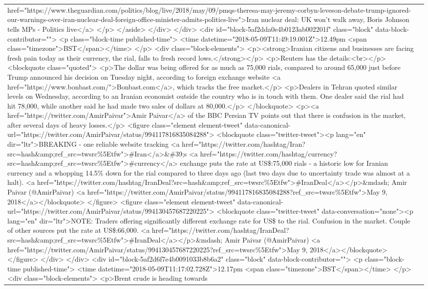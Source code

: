 \documentclass[]{article}
\begin{document}
\begin{table}[!h]
{\begin{tabular}[t]{ll}
href="https://www.theguardian.com/politics/blog/live/2018/may/09/pmqs-theresa-may-jeremy-corbyn-leveson-debate-trump-ignored-our-warnings-over-iran-nuclear-deal-foreign-office-minister-admits-politics-live">Iran nuclear deal: UK won't walk away, Boris Johnson tells MPs - Politics live</a> </p> </aside> </div>   </div> <div id="block-5af2dda0e4b0123ab002201f" class="block" data-block-contributor=""> <p class="block-time published-time"> <time datetime="2018-05-09T11:49:19.001Z">12.49pm <span class="timezone">BST</span></time> </p>    <div class="block-elements">  <p><strong>Iranian citizens and businesses are facing fresh pain today as their currency, the rial, falls to fresh record lows.</strong></p> <p>Reuters has the details:<br></p> <blockquote class="quoted"> <p>The dollar was being offered for as much as 75,000 rials, compared to around 65,000 just before Trump announced his decision on Tuesday night, according to foreign exchange website <a href="https://www.bonbast.com/">Bonbast.com</a>, which tracks the free market.</p> <p>Dealers in Tehran quoted similar levels on Wednesday, according to an Iranian economist outside the country who is in touch with them. One dealer said the rial had hit 78,000, while another said he had made two sales of dollars at 80,000.</p> </blockquote> <p><a href="https://twitter.com/AmirPaivar">Amir Paivar</a> of the BBC Persian TV points out that there is confusion in the market, after several days of heavy losses.</p>  <figure class="element element-tweet" data-canonical-url="https://twitter.com/AmirPaivar/status/994117816835084288">  <blockquote class="twitter-tweet"><p lang="en" dir="ltr">BREAKING - one reliable website tracking <a href="https://twitter.com/hashtag/Iran?src=hash\&amp;ref\_src=twsrc\%5Etfw">\#Iran</a>\&\#39;s <a href="https://twitter.com/hashtag/currency?src=hash\&amp;ref\_src=twsrc\%5Etfw">\#currency</a> exchange puts the rate at US\$:75,000 rials - a historic low for Iranian currency and a whopping 14.5\% down for the rial compared to three days ago (last two days due to uncertainty trade was almost at a halt). <a href="https://twitter.com/hashtag/IranDeal?src=hash\&amp;ref\_src=twsrc\%5Etfw">\#IranDeal</a></p>\&mdash; Amir Paivar (@AmirPaivar) <a href="https://twitter.com/AmirPaivar/status/994117816835084288?ref\_src=twsrc\%5Etfw">May 9, 2018</a></blockquote>  </figure>  <figure class="element element-tweet" data-canonical-url="https://twitter.com/AmirPaivar/status/994130457687220225">  <blockquote class="twitter-tweet" data-conversation="none"><p lang="en" dir="ltr">NOTE: Traders offering significantly different exchange rate for US\$ to the rial. Confusion in the market. Couple of other sources put the rate at US\$:66,000. <a href="https://twitter.com/hashtag/IranDeal?src=hash\&amp;ref\_src=twsrc\%5Etfw">\#IranDeal</a></p>\&mdash; Amir Paivar (@AmirPaivar) <a href="https://twitter.com/AmirPaivar/status/994130457687220225?ref\_src=twsrc\%5Etfw">May 9, 2018</a></blockquote>  </figure> </div>   </div> <div id="block-5af2d6f7e4b0091033b8b6a2" class="block" data-block-contributor=""> <p class="block-time published-time"> <time datetime="2018-05-09T11:17:02.728Z">12.17pm <span class="timezone">BST</span></time> </p>    <div class="block-elements">  <p>Brent crude is heading towards 
\end{tabular}}
\end{table}
\end{document}
